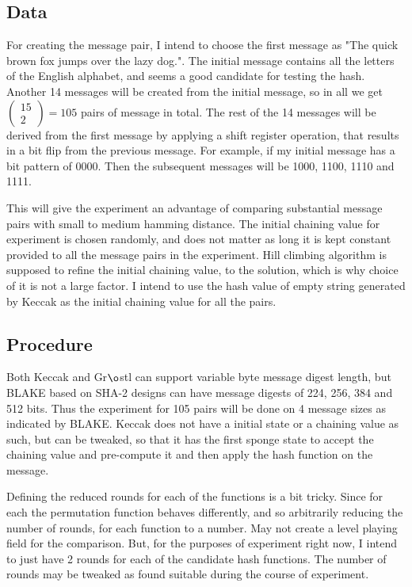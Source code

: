   \subsection{Data}
  
  For creating the message pair, I intend to choose the first message as "The quick brown fox jumps over the lazy dog.".
  The initial message contains all the letters of the English alphabet, and seems a good candidate for testing the hash.
  Another 14 messages will be created from the initial message, so in all we get $\begin{pmatrix} 15 \\ 2 \end{pmatrix}
  = 105$ pairs of message in total. The rest of the 14 messages will be derived from the first message by applying a
  shift register operation, that results in a bit flip from the previous message. For example, if my initial message has
  a bit pattern of 0000. Then the subsequent messages will be 1000, 1100, 1110 and 1111.

  This will give the experiment an advantage of comparing substantial message pairs with small to medium hamming distance.
  The initial chaining value for experiment is chosen randomly, and does not matter as long it is kept constant provided
  to all the message pairs in the experiment. Hill climbing algorithm is supposed to refine the initial chaining value,
  to the solution, which is why choice of it is not a large factor. I intend to use the hash value of empty string generated
  by Keccak as the initial chaining value for all the pairs.

  \subsection{Procedure}

  Both Keccak and Gr$\o$stl can support variable byte message digest length, but BLAKE based on SHA-2 designs can have
  message digests of 224, 256, 384 and 512 bits. Thus the experiment for 105 pairs will be done on 4 message sizes as
  indicated by BLAKE. Keccak does not have a initial state or a chaining value as such, but can be tweaked, so that it
  has the first sponge state to accept the chaining value and pre-compute it and then apply the hash function on the
  message.

  Defining the reduced rounds for each of the functions is a bit tricky. Since for each the permutation function behaves
  differently, and so arbitrarily reducing the number of rounds, for each function to a number. May not create a level
  playing field for the comparison. But, for the purposes of experiment right now, I intend to just have 2 rounds for 
  each of the candidate hash functions. The number of rounds may be tweaked as found suitable during the course of 
  experiment.
